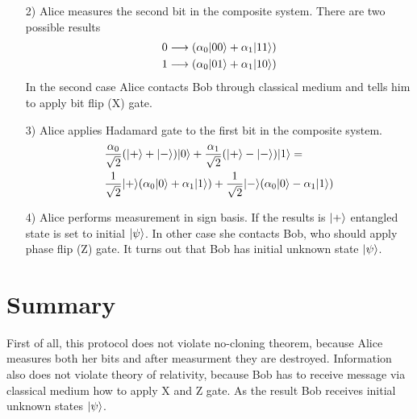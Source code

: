 \begin{multicols*}{2}
\begin{enumerate}[leftmargin=0cm,itemindent=.5cm,labelwidth=\itemindent,labelsep=0cm,align=left]
\item[2)] Alice measures the second bit in the composite system. There are two possible results
\begin{align*}
0\longrightarrow(\alpha_0{\left\vert{00}\right\rangle}+\alpha_1{\left\vert{11}\right\rangle})\\
1\longrightarrow(\alpha_0{\left\vert{01}\right\rangle}+\alpha_1{\left\vert{10}\right\rangle})
\end{align*}
In the second case Alice contacts Bob through classical medium and tells him to apply bit flip (X) gate.
\item[3)] Alice applies Hadamard gate to the first bit in the composite system.
\begin{align*}
&\frac{\alpha_0}{\sqrt{2}}({\left\vert{+}\right\rangle}+{\left\vert{-}\right\rangle}){\left\vert{0}\right\rangle}+\frac{\alpha_1}{\sqrt{2}}({\left\vert{+}\right\rangle}-{\left\vert{-}\right\rangle}){\left\vert{1}\right\rangle} = \\
&\frac{1}{\sqrt{2}}{\left\vert{+}\right\rangle}(\alpha_0{\left\vert{0}\right\rangle}+\alpha_1{\left\vert{1}\right\rangle})+\frac{1}{\sqrt{2}}{\left\vert{-}\right\rangle}(\alpha_0{\left\vert{0}\right\rangle}-\alpha_1{\left\vert{1}\right\rangle})
\end{align*}
\item[4)] Alice performs measurement in sign basis. If the results is ${\left\vert{+}\right\rangle}$ entangled state is set to initial ${\left\vert{\psi}\right\rangle}$. In other case she contacts Bob, who should apply phase flip (Z) gate. It turns out that Bob has initial unknown state ${\left\vert{\psi}\right\rangle}$.
\end{enumerate}
\section{Summary}
First of all, this protocol does not violate no-cloning theorem, because Alice measures both her bits and after measurment they are destroyed. Information also does not violate theory of relativity, because Bob has to receive message via classical medium how to apply X and Z gate. As the result Bob receives initial unknown states ${\left\vert{\psi}\right\rangle}$.
\end{multicols*}
